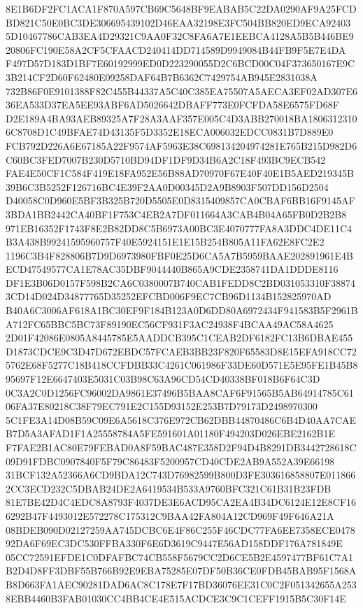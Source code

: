 \documentclass[UTF8,fontset=fandol,zihao=-4,a4paper]{ctexart}
\begin{document}
{{8E1B6DF2FC1ACA1F870A597CB69C5648BF9EABAB5C22DA0290AF9A25FCDBD821C50E0BC3DE306695439102D46EAA32198E3FC504BB820ED9ECA92403
5D10467786CAB3EA4D29321C9AA0F32C8FA6A7E1EEBCA4128A5B5B446BE920806FC190E58A2CF5CFAACD240414DD714589D9949084B44FB9F5E7E4DA
F497D57D183D1BF7E60192999ED0D223290055D2C6BCD00C04F373650167E9C3B214CF2D60F62480E09258DAF64B7B6362C7429754AB945E2831038A
732B86F0E9101388F82C455B44337A5C40C385EA75507A5AECA3EF02AD307E636EA533D37EA5EE93ABF6AD5026642DBAFF773E0FCFDA58E6575FD68F
D2E189A4BA93AEB89325A7F28A3AAF357E005C4D3ABB270018BA18063123106C8708D1C49BFAE74D43135F5D3352E18ECA006032EDCC0831B7D889E0
FCB792D226A6E67185A22F9574AF5963E38C698134204974281E765B215D982D6C60BC3FED7007B230D5710BD94DF1DF9D34B6A2C18F493BC9ECB542
FAE4E50CF1C584F419E18FA952E56B88AD70970F67E40F40E1B5AED219345B39B6C3B5252F126716BC4E39F2AA0D00345D2A9B8903F507DD156D2504
D40058C0D960E5BF3B325B720D5505E0D8315409857CA0CBAF6BB16F9145AF3BDA1BB2442CA40BF1F753C4EB2A7DF011664A3CAB4B04A65FB0D2B2B8
971EB16352F1743F8E2B82DD8C5B6973A00BC3E4070777FA8A3DDC4DE11C4B3A438B99241595960757F40E5924151E1E15B254B805A11FA62E8FC2E2
1196C3B4F828806B7D9D6973980FBF0E25D6CA5A7B5959BAAE202891961E4BECD47549577CA1E78AC35DBF9044440B865A9CDE2358741DA1DDDE8116
DF1E3B06D0157F598B2CA6C0380007B740CAB1FEDD8C2BD031053310F388743CD14D024D34877765D35252EFCBD006F9EC7CB96D1134B152825970AD
B40A6C3006AF618A1BC30EF9F184B123A0D6DD80A6972434F941583B5F2961BA712FC65BBC5BC73F89190EC56CF931F3AC24938F4BCAA49AC58A4625
2D01F42086E0805A8445785E5AADDCB395C1CEAB2DF6182FC13B6DBAE455D1873CDCE9C3D47D672EBDC57FCAEB3BB23F820F65583D8E15EFA918CC72
5762E68F5277C18B418CCFDBB33C4261C061986F33DE60D571E5E95FE1B45B895697F12E6647403E5031C03B98C63A96CD54CD40338BF018B6F64C3D
0C3A2C0D1256FC96002DA9861E37496B5BAA8CAF6F91565B5AB64914785C6106FA37E80218C38F79EC791E2C155D93152E253B7D79173D2498970300
5C1FE3A14D08B59C09E6A5618C376E972CB62DBB44870486C6B4D40AA7CAEB7D5A3AFAD1F1A25558784A5FE591601A01180F494203D026EBE2162B1E
F7FAE2B1AC80E79FEBAD0A8F59BAC487E358D2F94D4B8291DB3442728618C09D91FDBC0907840F5F79C86483F5200957CD40CDE2AB9A552A39E66198
31BCF132A52366A6CD9BDA12C743D76982599B800D3FE303616858807E0118662CC3ECD232C5DBAB24DE2A6419534B533A9760BFC321C61B31B23FDB
81E7BE42D4C4EDC8A8793F4037DE3E6ACD95CA2EA4B34DC6124E12E8CF166292B47F4493012E572278C175312C9BAA42FA804A12CD969F49F646A21A
08BDEB090D02127259AA745DCBC6E4F86C255F46CDC77FA6EE7358ECE047892DA6F69EC3DC530FFBA330F6E6D3619C9447E56AD158DDF176A781849E
05CC72591EFDE1C0DFAFBC74CB558F5679CC2D6CE5B2E4597477BF61C7A1B2D4D8FF3DBF55B766B92E9EBA75285E07DF50B36CE0FDB45BAB95F1568A
B8D663FA1AEC90281DAD6AC8C178E7F17BD36076EE31C0C2F051342655A2538EBB4460B3FAB01030CC4BB4CE4E515ACDCE3C9C1CEFF1915B5C30F14E
}}
\end{document}
